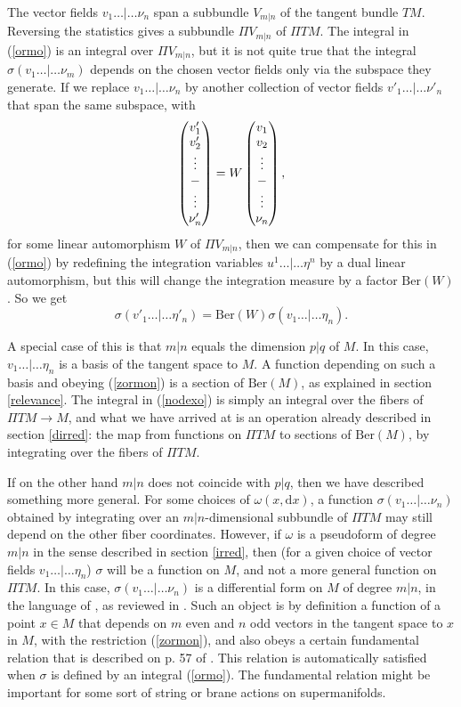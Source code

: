 \documentclass[11pt,a4paper]{article}
\def\d{{\mathrm d}}
\def\Ber{{\mathrm {Ber}}}
\def\Pi{\varPi}
\begin{document}
The vector fields $v_1\dots |\dots \nu_n$ span a subbundle $V_{m|n}$ of the tangent bundle $TM$.  Reversing the statistics gives
a subbundle ${\Pi} V_{m|n}$ of ${\Pi} TM$.  The integral in (\ref{ormo}) is an integral over ${\Pi} V_{m|n}$, but it is not quite true that the integral
$\sigma(v_1\dots|\dots\nu_m)$
depends on the chosen vector fields only via  the subspace they generate.  If we replace $v_1\dots|\dots \nu_n$ by another collection of vector fields
$v'_1\dots|\dots \nu'_n$ that span the same subspace,  with
\begin{equation}\label{nodexo}\begin{pmatrix}v_1'\cr v_2'\cr \vdots \cr - \cr \vdots \cr \nu'_n\end{pmatrix} =
W \begin{pmatrix}v_1\cr v_2\cr \vdots \cr - \cr \vdots \cr \nu_n\end{pmatrix},\end{equation}
for some linear automorphism $W$ of ${\Pi} V_{m|n}$, then we can compensate for this in (\ref{ormo}) by redefining the integration
variables $u^1\dots| \dots \eta^n$ by a dual linear automorphism, but this will change the integration measure by a factor $\Ber(W)$.
So we get
\begin{equation}\label{zormon} \sigma(v'_1\dots|\dots \eta'_n)=\Ber(W)\sigma(v_1\dots|\dots\eta_n). \end{equation}

A special case of this is that $m|n$ equals the dimension $p|q$ of $M$.  In this case, $v_1\dots|\dots \eta_n$ is a basis of the tangent space to $M$.
A function depending on such a basis and obeying (\ref{zormon}) is a section of $\Ber(M)$, as explained in section \ref{relevance}.  The integral 
in (\ref{nodexo}) is simply an integral over the fibers of ${\Pi} TM\to M$, and what we have arrived at is an operation already described in section \ref{dirred}:
the map from functions on ${\Pi} TM$ to sections of  $\Ber(M)$, by integrating over the fibers of ${\Pi} TM$.

If on the other hand $m|n$ does not coincide with $p|q$, then we have described something more general. For some choices of $\omega(x,\d x)$, a function
$\sigma(v_1\dots|\dots\nu_n)$ obtained by integrating over an $m|n$-dimensional subbundle of ${\Pi} TM$ may still depend on the other fiber coordinates.
However, if $\omega$ is a pseudoform of degree $m|n$ in the sense described in section \ref{irred}, then (for a given choice of vector fields $v_1\dots|\dots\eta_n$)
$\sigma$ will be a function on $M$, and not a more general function on ${\Pi} TM$.  
In this case, $\sigma(v_1\dots|\dots\nu_n)$ is a differential form on $M$ of degree $m|n$, in the language of  \cite{VZ,VZtwo}, as reviewed in \cite{Voronov}.
Such an object is by definition a function of a point $x\in M$ that  depends on  $m$ even and $n$
odd vectors in the tangent space to $x$ in $M$, with the restriction  (\ref{zormon}), and also obeys a certain fundamental relation 
that is described on p. 57 of \cite{Voronov}.  This relation
is automatically satisfied when $\sigma$ is defined by an integral (\ref{ormo}).  The fundamental relation might be important for some sort
of string or brane actions on supermanifolds.
\end{document}
